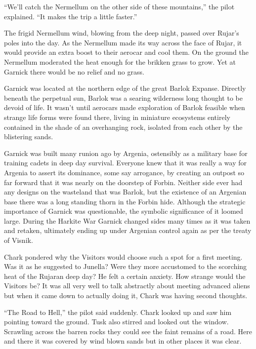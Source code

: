 ``We'll catch the Nermellum on the other side of these mountains,'' the pilot explained. ``It
makes the trip a little faster.''


The frigid Nermellum wind, blowing from the deep night, passed over Rujar's poles into the day.
As the Nermellum made its way across the face of Rujar, it would provide an extra boost to their
aerocar and cool them. On the ground the Nermellum moderated the heat enough for the brikken
grass to grow. Yet at Garnick there would be no relief and no grass.

Garnick was located at the northern edge of the great Barlok Expanse. Directly beneath the
perpetual sun, Barlok was a searing wilderness long thought to be devoid of life. It wasn't
until aerocars made exploration of Barlok feasible when strange life forms were found there,
living in miniature ecosystems entirely contained in the shade of an overhanging rock, isolated
from each other by the blistering sands.

Garnick was built many runion ago by Argenia, ostensibly as a military base for training cadets
in deep day survival. Everyone knew that it was really a way for Argenia to assert its
dominance, some say arrogance, by creating an outpost so far forward that it was nearly on the
doorstep of Forbin. Neither side ever had any designs on the wasteland that was Barlok, but the
existence of an Argenian base there was a long standing thorn in the Forbin hide. Although the
strategic importance of Garnick was questionable, the symbolic significance of it loomed large.
During the Harkite War Garnick changed sides many times as it was taken and retaken, ultimately
ending up under Argenian control again as per the treaty of Visnik.


Chark pondered why the Visitors would choose such a spot for a first meeting. Was it as he
suggested to Junella? Were they more accustomed to the scorching heat of the Rujaran deep day?
He felt a certain anxiety. How strange would the Visitors be? It was all very well to talk
abstractly about meeting advanced aliens but when it came down to actually doing it, Chark was
having second thoughts.

``The Road to Hell,'' the pilot said suddenly. Chark looked up and saw him pointing toward the
ground. Tusk also stirred and looked out the window. Scrawling across the barren rocks they
could see the faint remains of a road. Here and there it was covered by wind blown sands but in
other places it was clear.

